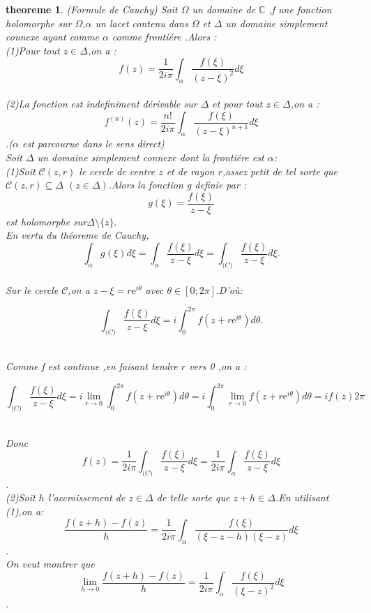 \documentclass[a4paper,12pt]{book}
\newtheorem{theoreme}{theoreme}[section]
\newcommand{\expo}[1]{\mathrm{e}^{#1}}
\begin{document}
\begin{theoreme}{(Formule de Cauchy)}
	Soit $ \Omega$ un domaine de $\mathbb{C}$ ,f une fonction holomorphe sur $\Omega$,$\alpha$ un lacet contenu dans $\Omega$ et $\Delta$ un domaine simplement connexe ayant comme $\alpha$ comme frontiére .Alors :\\
	(1)Pour tout $z\in\Delta$,on a :$$f(z)=\frac{1}{2i\pi}\int_{\alpha}\frac{f(\xi)}{(z-\xi)^2}d\xi $$\\
	(2)La fonction est indefiniment dérivable sur $\Delta$ et pour tout $ z\in \Delta$,on a : $$f^{(n)}(z)= \frac{n!}{2i\pi}\int_{\alpha}\frac{f(\xi)}{(z-\xi)^{n+1}}d\xi$$.($\alpha$ est parcourue dans le sens direct)\\
	Soit $\Delta$ un domaine simplement connexe dont la frontiére est $\alpha$:\\
	(1)Soit $\mathcal{C}(z,r)$ le cercle de centre $z$ et de rayon $r$,assez petit de tel sorte que $\mathcal{C}(z,r)\subseteq\Delta$ $(z\in \Delta)$.Alors la fonction g definie par : $$g(\xi)=\frac{f(\xi)}{z-\xi}$$ est holomorphe sur$\Delta\setminus\{z\}.$\\En vertu du théoreme de Cauchy,$$\int_{\alpha}g(\xi)d\xi=\int_{\alpha}\frac{f(\xi)}{z-\xi}d\xi=\int_{\mathcal(C)}\frac{f(\xi)}{z-\xi}d\xi.$$\\Sur le cercle $\mathcal{C}$,on a $z-\xi=r\expo{i\theta} $ avec $ \theta \in [0;2\pi].$D'où:
	\begin{center}
		$$\int_{\mathcal(C)}\frac{f(\xi)}{z-\xi} d\xi=i\int_{0}^{2\pi}f(z+r\expo{i\theta})d\theta.$$\\
	\end{center}
		Comme f est continue ,en faisant tendre $r$ vers 0 ,on a :\\
		\begin{center}
			$$\int_{\mathcal(C)}\frac{f(\xi)}{z-\xi}d\xi=i\lim_{r\to 0}\int_{0}^{2\pi}f(z+r\expo{i\theta})d\theta=i\int_{0}^{2\pi}\lim_{r \to 0 }f(z+r\expo{i\theta})d\theta= if(z)2\pi$$\\
		\end{center}
			Donc $$f(z)=\frac{1}{2i\pi}\int_{\mathcal(C)}\frac{f(\xi)}{z-\xi}d\xi=\frac{1}{2i\pi}\int_{\alpha}\frac{f(\xi)}{z-\xi}d\xi$$.\\
			(2)Soit $h$ l'accroissement de $z \in \Delta$ de telle sorte que $ z+h\in \Delta$.En utilisant (1),on a: $$\frac{f(z+h)-f(z)}{h}=\frac{1}{2i\pi}\int_{\alpha}\frac{f(\xi)}{(\xi -z -h)(\xi -z)}d\xi $$.\\
			On veut montrer que $$\lim_{h \to 0}\frac{f(z+h)-f(z)}{h}=\frac{1}{2i\pi}\int_{\alpha}\frac{f(\xi)}{(\xi-z)^2}d\xi$$.\\

\end{theoreme}
\end{document}
